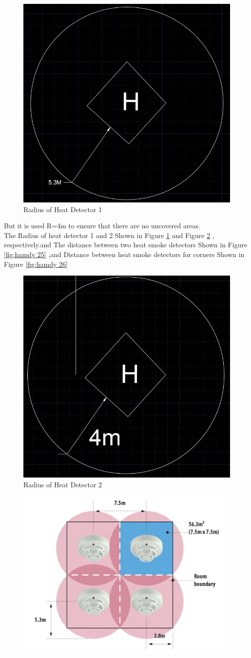 \documentclass[12pt,fleqn]{book} %
\begin{document}
\begin{enumerate}
\begin{itemize}
    \begin{figure}[!h]
    \centering
    \includegraphics[width=0.5\linewidth]{hamdy 23.png}
    \caption{Radius of Heat Detector 1}
    \label{fig:hamdy 23}
\end{figure} 
But it is used R=4m to ensure that there are no uncovered areas.\\
The Radius of heat detector 1 and 2 Shown in Figure \ref{fig:hamdy 23} and Figure \ref{fig:hamdy 24} , respectively.and The distance between two heat smoke detectors Shown in Figure \ref{fig:hamdy 25} ,and Distance between heat smoke detectors for corners Shown in Figure \ref{fig:hamdy 26}
  \begin{figure}[!h]
    \centering
    \includegraphics[width=0.5\linewidth]{hamdy 24.png}
    \caption{Radius of Heat Detector 2}
    \label{fig:hamdy 24}
\end{figure} 
\begin{figure}[!h]
    \centering
    \includegraphics[width=0.7\linewidth]{hamdy 25.png}

\end{figure}
\end{itemize}
\end{enumerate}
\end{document}
